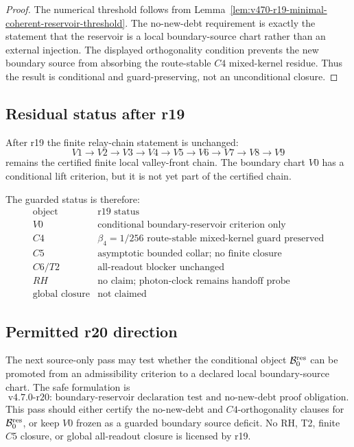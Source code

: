 \begin{proof}
The numerical threshold follows from Lemma~\ref{lem:v470-r19-minimal-coherent-reservoir-threshold}.
The no-new-debt requirement is exactly the statement that the reservoir is a
local boundary-source chart rather than an external injection.  The displayed
orthogonality condition prevents the new boundary source from absorbing the
route-stable \(C4\) mixed-kernel residue.  Thus the result is conditional and
guard-preserving, not an unconditional closure.
\end{proof}

\subsection{Residual status after r19}
\label{subsec:v470-r19-residual-status}

After r19 the finite relay-chain statement is unchanged:
\[
V1\to V2\to V3\to V4\to V5\to V6\to V7\to V8\to V9
\]
remains the certified finite local valley-front chain.  The boundary chart
\(V0\) has a conditional lift criterion, but it is not yet part of the certified
chain.

The guarded status is therefore:
\[
\boxed{
\begin{array}{c|c}
\text{object} & \text{r19 status}\\
\hline
V0 & \text{conditional boundary-reservoir criterion only}\\
C4 & \beta_4=1/256\text{ route-stable mixed-kernel guard preserved}\\
C5 & \text{asymptotic bounded collar; no finite closure}\\
C6/T2 & \text{all-readout blocker unchanged}\\
RH & \text{no claim; photon-clock remains handoff probe}\\
\text{global closure} & \text{not claimed}
\end{array}
}
\]

\subsection{Permitted r20 direction}
\label{subsec:v470-r19-permitted-r20-direction}

The next source-only pass may test whether the conditional object
\(\mathcal B_0^{\rm res}\) can be promoted from an admissibility criterion to a
declared local boundary-source chart.  The safe formulation is
\[
\boxed{
\text{v4.7.0-r20: boundary-reservoir declaration test and no-new-debt proof obligation.}
}
\]
This pass should either certify the no-new-debt and \(C4\)-orthogonality clauses
for \(\mathcal B_0^{\rm res}\), or keep \(V0\) frozen as a guarded boundary
source deficit.  No RH, T2, finite \(C5\) closure, or global all-readout closure
is licensed by r19.



